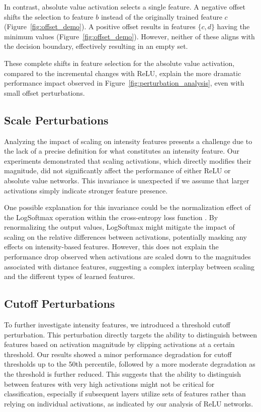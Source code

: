 In contrast, absolute value activation selects a single feature. A negative offset shifts the selection to feature $b$ instead of the originally trained feature $c$ (Figure~\ref{fig:offset_demo}). A positive offset results in features $\{c, d\}$ having the minimum values (Figure~\ref{fig:offset_demo}). However, neither of these aligns with the decision boundary, effectively resulting in an empty set.

These complete shifts in feature selection for the absolute value activation, compared to the incremental changes with ReLU, explain the more dramatic performance impact observed in Figure~\ref{fig:perturbation_analysis}, even with small offset perturbations.

\subsection{Scale Perturbations}

Analyzing the impact of scaling on intensity features presents a challenge due to the lack of a precise definition for what constitutes an intensity feature. Our experiments demonstrated that scaling activations, which directly modifies their magnitude, did not significantly affect the performance of either ReLU or absolute value networks. This invariance is unexpected if we assume that larger activations simply indicate stronger feature presence.

One possible explanation for this invariance could be the normalization effect of the LogSoftmax operation within the cross-entropy loss function \cite{bridle1990probabilistic}. By renormalizing the output values, LogSoftmax might mitigate the impact of scaling on the relative differences between activations, potentially masking any effects on intensity-based features. However, this does not explain the performance drop observed when activations are scaled down to the magnitudes associated with distance features, suggesting a complex interplay between scaling and the different types of learned features.

\subsection{Cutoff Perturbations}

To further investigate intensity features, we introduced a threshold cutoff perturbation. This perturbation directly targets the ability to distinguish between features based on activation magnitude by clipping activations at a certain threshold. Our results showed a minor performance degradation for cutoff thresholds up to the 50th percentile, followed by a more moderate degradation as the threshold is further reduced. This suggests that the ability to distinguish between features with very high activations might not be critical for classification, especially if subsequent layers utilize sets of features rather than relying on individual activations, as indicated by our analysis of ReLU networks.

